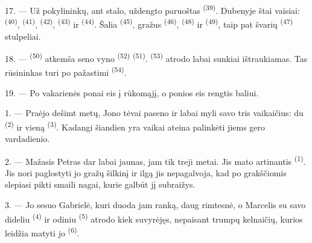 \VUsaut{2.4mm}
\VUsaut{3.0mm}

17. --- Už pokylininkų, ant stalo, uždengto  paruoštas
 \textsuperscript{(39)}. Dubenyje štai vaisiai: 
\textsuperscript{(40)},  \textsuperscript{(41)}, 
\textsuperscript{(42)},  \textsuperscript{(43)} ir
 \textsuperscript{(44)}. Šalia 
\textsuperscript{(45)}, gražus  \textsuperscript{(46)},
 \textsuperscript{(48)} ir 
\textsuperscript{(49)}, taip pat švarių  \textsuperscript{(47)}
stulpeliai.

18. ---  \textsuperscript{(50)} atkemša seno vyno
 \textsuperscript{(52)}  \textsuperscript{(51)}.
 \textsuperscript{(53)} atrodo labai sunkiai ištraukiamas. Tas
rūsininkas turi po pažastimi  \textsuperscript{(54)}.

19. --- Po vakarienės ponai eis į rūkomąjį, o ponios eis rengtis baliui.

\VUsaut{5.0mm}
\VUsaut{1.6mm}
\VUsaut{2.6mm}

\VUsaut{3.0mm}

1. --- Praėjo dešimt metų, Jono tėvai paseno ir labai myli savo tris vaikaičius: du
 \textsuperscript{(2)} ir vieną  \textsuperscript{(3)}.
Kadangi šiandien yra  vaikai ateina palinkėti jiems
gero vardadienio.

2. --- Mažasis Petras dar labai jaunas, jam tik treji metai. Jis mato artinantis
 \textsuperscript{(1)}. Jis nori paglostyti jo gražų šilkinį
 ir ilgą  jis nepagalvoja, kad po grakščiomis
 slepiasi pikti smaili nagai, kurie galbūt jį subraižys.

3. --- Jo sesuo Gabrielė, kuri duoda jam ranką, daug rimtesnė, o Marcelis su savo
dideliu  \textsuperscript{(4)} ir odiniu 
\textsuperscript{(5)} atrodo kiek suvyrėjęs, nepaisant trumpų kelnaičių, kurios
leidžia matyti jo  \textsuperscript{(6)}.

